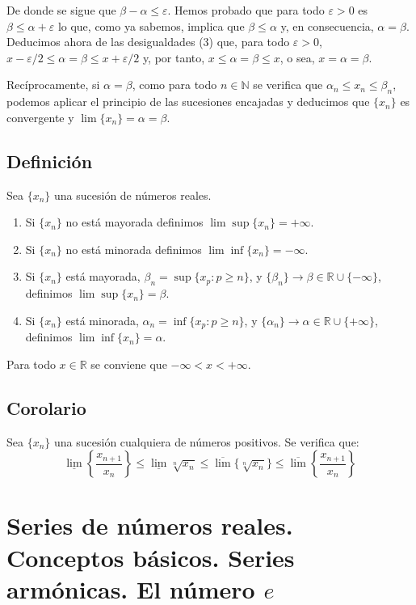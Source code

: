 \documentclass[10pt,a4paper]{article}
\begin{document}
	De donde se sigue que $\beta - \alpha \leq \varepsilon$. Hemos probado que para todo $\varepsilon > 0$ es $\beta \leq \alpha + \varepsilon$ lo que, como ya sabemos, implica que $\beta \leq \alpha$ y, en consecuencia, $\alpha = \beta$. Deducimos ahora de las desigualdades (3) que, para todo $\varepsilon > 0$, $x - \varepsilon/2 \leq \alpha = \beta \leq x + \varepsilon/2$ y, por tanto, $x \leq \alpha = \beta \leq x$, o sea, $x = \alpha = \beta$.
	
	Recíprocamente, si $\alpha = \beta$, como para todo $n \in \mathbb{N}$ se verifica que $\alpha_n \leq x_n \leq \beta_n$, podemos aplicar el principio de las sucesiones encajadas y deducimos que $\{x_n\}$ es convergente y $\lim\{x_n\} = \alpha = \beta$.
	
	\subsection{Definición}
	Sea $\{x_n\}$ una sucesión de números reales.
	\begin{enumerate}[label = \roman*)]
		\item Si $\{x_n\}$ no está mayorada definimos $\lim \sup \{x_n\} = + \infty$.
		\item Si $\{x_n\}$ no está minorada definimos $\lim \inf \{x_n\} = - \infty$.
		\item Si $\{x_n\}$ está mayorada, $\beta_n = \sup\{x_p : p \geq n\}$, y $ \{\beta_n\} \rightarrow \beta \in \mathbb{R} \cup \{- \infty\}$, definimos $\lim \sup \{x_n\} = \beta$.
		\item Si $\{x_n\}$ está minorada, $\alpha_n = \inf\{x_p : p \geq n\}$, y $\{\alpha_n\} \rightarrow \alpha \in \mathbb{R} \cup \{+ \infty\}$, definimos $\lim \inf\{x_n\} = \alpha$.
	\end{enumerate}
	Para todo $x \in \mathbb{R}$ se conviene que $- \infty < x < + \infty$.
	
	\subsection{Corolario}
	Sea $\{x_n\}$ una sucesión cualquiera de números positivos. Se verifica que:
	$$ \underline\lim\left\{\dfrac{x_{n+1}}{x_n}\right\} \leq \underline\lim{\sqrt[n]{x_n}} \leq \overline\lim\{\sqrt[n]{x_n}\} \leq \overline\lim\left\{\dfrac{x_{n+1}}{x_n}\right\}$$
	
	\newpage
	
	\section{Series de números reales. Conceptos básicos. Series armónicas. El número $e$}
	
\end{document}
